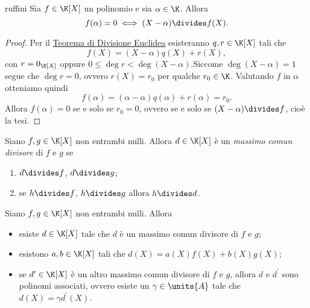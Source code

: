 \begin{theorem}
     {ruffini}
    Sia $f \in \K[X]$ un polinomio e sia $\alpha \in \K$. Allora \begin{equation}
        f(\alpha) = 0 \iff (X - \alpha) \divides f(X).
    \end{equation}
\end{theorem}
\begin{proof}
    Per il \hyperref[th:divisione_euclidea_KX]{Teorema di Divisione Euclidea} esisteranno $q, r \in \K[X]$ tali che \[
        f(X) = (X - \alpha)q(X) + r(X),   
    \] con $r = 0_{\K[X]}$ oppure $0 \leq \deg r < \deg (X - \alpha)$.Siccome $\deg (X - \alpha) = 1$ segue che $\deg r = 0$, ovvero $r(X) = r_0$ per qualche $r_0 \in \K$. Valutando $f$ in $\alpha$ otteniamo quindi \[
        f(\alpha) = (\alpha - \alpha)q(\alpha) + r(\alpha) = r_0.    
    \] Allora $f(\alpha) = 0$ se e solo se $r_0 = 0$, ovvero se e solo se $(X-\alpha) \divides f$, cioè la tesi.
\end{proof}

\begin{definition}
    Siano $f, g \in \K[X]$ non entrambi nulli. Allora $d \in \K[X]$ è un \emph{massimo comun divisore} di $f$ e $g$ se \begin{enumerate}[label={(\roman*)}]
        \item $d \divides f$, $d \divides g$;
        \item se $h \divides f$, $h \divides g$ allora $h \divides d$.
    \end{enumerate}
\end{definition}

\begin{theorem}
    Siano $f, g \in \K[X]$ non entrambi nulli. Allora \begin{itemize}
        \item esiste $d \in \K[X]$ tale che $d$ è un massimo comun divisore di $f$ e $g$;
        \item esistono $a, b \in \K[X]$ tali che $d(X) = a(X)f(X) + b(X)g(X)$;
        \item se $d^\prime \in \K[X]$ è un altro massimo comun divisore di $f$ e $g$, allora $d$ e $d^\prime$ sono polinomi associati, ovvero esiste un $\gamma \in \units{A}$ tale che $d(X) = \gamma d^\prime(X)$.
    \end{itemize}
\end{theorem}

